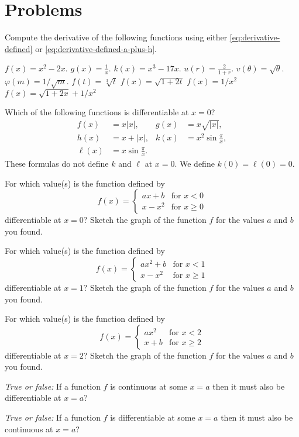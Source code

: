 \section{Problems}
\problemfont

\begin{multicols}{2}\setlength{\parindent}{0pt}
\noindent%
Compute the derivative of the following functions
using either \eqref{eq:derivative-defined} or
\eqref{eq:derivative-defined-a-plus-h}.


\problem $f(x) = x^2-2x $.
\problem $g(x) = \frac1x $.
\problem $k(x) = x^3-17x $.
\problem $u(r) = \frac2{1+r} $.
\problem $v(\theta) = \sqrt{\theta} $.
\problem $\varphi(m) = 1/{\sqrt m}$.
\problem $f(t) = \sqrt[3]{t}$
\problem $f(x) = \sqrt{1+2t}$
\problem $f(x) = 1/x^2$
\problem $f(x) = \sqrt{1+2x} + 1/x^2$

\problem Which of the following functions is differentiable at $x=0$?
\begin{align*}
  f(x) &= x|x|, &g(x) &= x\sqrt{|x|}, \\
  h(x) &= x+|x|, &k(x) &= x^2\sin\frac\pi x,\\
  \ell(x) &= x\sin\frac\pi x.&&
\end{align*}
These formulas do not define $k$ and $\ell$ at $x=0$.  We define $k(0) =
\ell(0) = 0$.


\problem For which value(s) is the function defined by
\[
f(x) = \begin{cases}
  ax+b &\text{for $x<0$} \\
  x-x^2 & \text{for $x\geq 0$}
\end{cases}
\]
differentiable at $x=0$?  Sketch the graph of the function $f$ for the
values $a$ and $b$ you found.

\problem For which value(s) is the function defined by
\[
f(x) = \begin{cases}
  ax^2+b &\text{for $x<1$} \\
  x-x^2 & \text{for $x\geq 1$}
\end{cases}
\]
differentiable at $x=1$?  Sketch the graph of the function $f$ for the
values $a$ and $b$ you found.

\problem For which value(s) is the function defined by
\[
f(x) = \begin{cases}
  ax^2 &\text{for $x<2$} \\
  x +b& \text{for $x\geq 2$}
\end{cases}
\]
differentiable at $x=2$?  Sketch the graph of the function $f$ for the
values $a$ and $b$ you found.


\problem \groupproblem
\textit{True or false: } If a function $f$ is continuous at some $x=a$
then it must also be differentiable at $x=a$?


\problem \groupproblem
\textit{True or false: } If a function $f$ is differentiable at some
$x=a$ then it must also be continuous at $x=a$?

\end{multicols}

